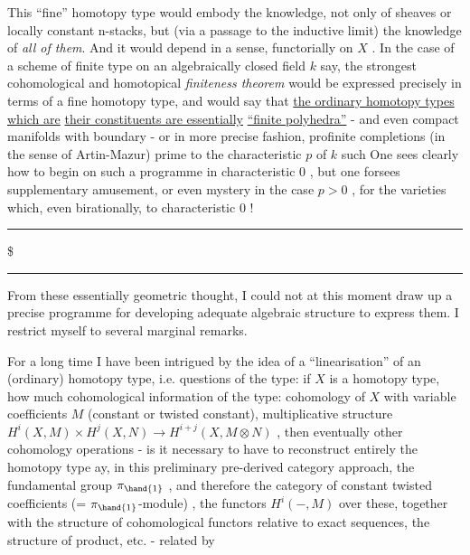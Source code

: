 
This ``fine'' homotopy type would embody the knowledge, not only of sheaves
or locally constant n-stacks, but (via a passage to the inductive limit)
the knowledge of \emph{all of them}. And it would depend\hand{,} in a  sense,
functorially on $X$ . In the case of a scheme of finite type on an
algebraically closed field $k$ say, the strongest cohomological and
homotopical \emph{finiteness theorem} would be expressed precisely in terms of a
fine homotopy type, and would say that \uline{the ordinary homotopy types which are}
\uline{their constituents are essentially} \uline{``finite polyhedra''} - and even compact
manifolds with boundary - or in more precise fashion,  profinite completions
(in the sense of Artin-Mazur) prime to the characteristic $p$ of $k$  
 such   One sees clearly how to begin on such a programme in
characteristic $0$ , but one forsees supplementary amusement, or even 
mystery\hand{,} in the case $p > 0$ , for the varieties which, even birationally,  
  to characteristic $0$ !

\noindent\rule{2cm}{0.4pt}\$\rule{2cm}{0.4pt}

 From these essentially geometric thought, I could not at this moment
draw up a precise programme for developing  adequate algebraic structure
to express them. I restrict myself to several marginal remarks.

For a long time I have been intrigued by the idea of a ``linearisation''
of an (ordinary) homotopy type, i.e. questions of the type: if $X$ is a
homotopy type, how much cohomological information of the type: cohomology
of $X$ with variable coefficients $M$ (constant or twisted constant),
multiplicative structure $H^i(X, M) \times H^j(X, N) \to H^{i+j}(X, M \otimes N)$ , then
eventually other cohomology operations - is it necessary to have to reconstruct
entirely the homotopy type \hand{(}ay, in this preliminary pre-derived category
approach,   the fundamental group $\pi_{\hand{1}}$ , and therefore the
category of constant twisted coefficients (= $\pi_{\hand{1}}$-module) , the functors
$H^i(-, M)$ over these, together with the structure of cohomological functors
relative to exact sequences, the structure of  product, etc. - related by

